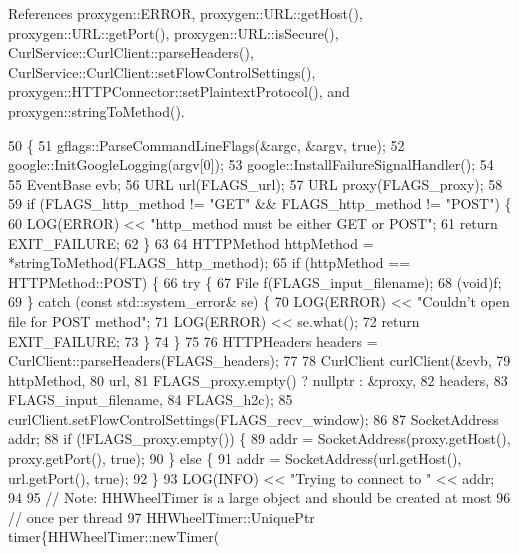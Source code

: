 References proxygen\+::\+E\+R\+R\+OR, proxygen\+::\+U\+R\+L\+::get\+Host(), proxygen\+::\+U\+R\+L\+::get\+Port(), proxygen\+::\+U\+R\+L\+::is\+Secure(), Curl\+Service\+::\+Curl\+Client\+::parse\+Headers(), Curl\+Service\+::\+Curl\+Client\+::set\+Flow\+Control\+Settings(), proxygen\+::\+H\+T\+T\+P\+Connector\+::set\+Plaintext\+Protocol(), and proxygen\+::string\+To\+Method().


\begin{DoxyCode}
50                                  \{
51   gflags::ParseCommandLineFlags(&argc, &argv, \textcolor{keyword}{true});
52   google::InitGoogleLogging(argv[0]);
53   google::InstallFailureSignalHandler();
54 
55   EventBase evb;
56   URL url(FLAGS\_url);
57   URL proxy(FLAGS\_proxy);
58 
59   \textcolor{keywordflow}{if} (FLAGS\_http\_method != \textcolor{stringliteral}{"GET"} && FLAGS\_http\_method != \textcolor{stringliteral}{"POST"}) \{
60     LOG(ERROR) << \textcolor{stringliteral}{"http\_method must be either GET or POST"};
61     \textcolor{keywordflow}{return} EXIT\_FAILURE;
62   \}
63 
64   HTTPMethod httpMethod = *stringToMethod(FLAGS\_http\_method);
65   \textcolor{keywordflow}{if} (httpMethod == HTTPMethod::POST) \{
66     \textcolor{keywordflow}{try} \{
67       File f(FLAGS\_input\_filename);
68       (void)f;
69     \} \textcolor{keywordflow}{catch} (\textcolor{keyword}{const} std::system\_error& se) \{
70       LOG(ERROR) << \textcolor{stringliteral}{"Couldn't open file for POST method"};
71       LOG(ERROR) << se.what();
72       \textcolor{keywordflow}{return} EXIT\_FAILURE;
73     \}
74   \}
75 
76   HTTPHeaders headers = CurlClient::parseHeaders(FLAGS\_headers);
77 
78   CurlClient curlClient(&evb,
79                         httpMethod,
80                         url,
81                         FLAGS\_proxy.empty() ? \textcolor{keyword}{nullptr} : &proxy,
82                         headers,
83                         FLAGS\_input\_filename,
84                         FLAGS\_h2c);
85   curlClient.setFlowControlSettings(FLAGS\_recv\_window);
86 
87   SocketAddress addr;
88   \textcolor{keywordflow}{if} (!FLAGS\_proxy.empty()) \{
89     addr = SocketAddress(proxy.getHost(), proxy.getPort(), \textcolor{keyword}{true});
90   \} \textcolor{keywordflow}{else} \{
91     addr = SocketAddress(url.getHost(), url.getPort(), \textcolor{keyword}{true});
92   \}
93   LOG(INFO) << \textcolor{stringliteral}{"Trying to connect to "} << addr;
94 
95   \textcolor{comment}{// Note: HHWheelTimer is a large object and should be created at most}
96   \textcolor{comment}{// once per thread}
97   HHWheelTimer::UniquePtr timer\{HHWheelTimer::newTimer(

\end{DoxyCode}

